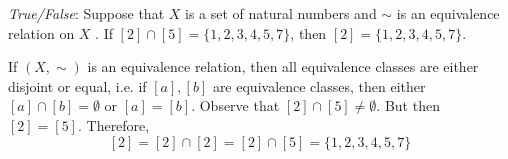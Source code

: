 \documentclass[11pt,letterpaper]{article}
\begin{document}
\quizsol \textit{True/False}: Suppose that $X$ is a set of natural numbers and $\sim$ is an equivalence relation on $X$ . If $[2] \cap [5]= \{ 1, 2, 3, 4, 5, 7 \}$, then $[2]= \{ 1, 2, 3, 4, 5, 7 \}$. \pspace

\sol If $(X, \sim)$ is an equivalence relation, then all equivalence classes are either disjoint or equal, i.e. if $[a], [b]$ are equivalence classes, then either $[a] \cap [b]= \emptyset$ or $[a]= [b]$. Observe that $[2] \cap [5] \neq \emptyset$. But then $[2]= [5]$. Therefore, 
	\[
	[2]= [2] \cap [2]= [2] \cap [5]= \{ 1, 2, 3, 4, 5, 7 \}
	\] \pvspace{1.5cm}


\end{document}
